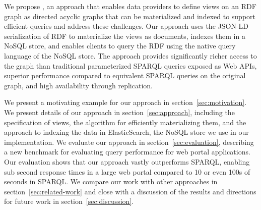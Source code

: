 We propose \ldviews, an approach that enables data providers to define views on an RDF graph as directed acyclic graphs that can be materialized and indexed to support efficient queries and address these challenges.
Our approach uses the JSON-LD serialization of RDF \cite{Lanthaler:2012:UJC:2307819.2307827} to materialize the views as documents, indexes them in a NoSQL store, and enables clients to query the RDF using the native query language of the NoSQL store.
%
The approach provides significantly richer access to the graph than traditional parameterized SPARQL queries exposed as Web APIs, superior performance compared to equivalent SPARQL queries on the original graph, and high availability through replication. 

We present a motivating example for our approach in section~\ref{sec:motivation}.
We present details of our approach in section~\ref{sec:approach}, including the specification of views, the algorithm for efficiently materializing them, and the approach to indexing the data in ElasticSearch, the NoSQL store we use in our implementation.
We evaluate our approach in section~\ref{sec:evaluation}, describing a new benchmark for evaluating query performance for web portal applications. 
Our evaluation shows that our approach vastly outperforms SPARQL, enabling sub second response times in a large web portal compared to 10 or even 100s of seconds in SPARQL.
We compare our work with other approaches in section~\ref{sec:related-work} and close with a discussion of the results and directions for future work in section~\ref{sec:discussion}.
